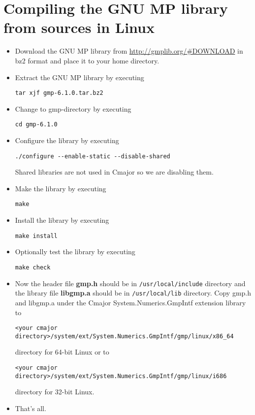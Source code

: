 \section{Compiling the GNU MP library from sources in Linux}

\begin{itemize}

\item
Download the GNU MP library from \url{http://gmplib.org/#DOWNLOAD} in bz2 format
and place it to your home directory.

\item
Extract the GNU MP library by executing
\begin{verbatim}
tar xjf gmp-6.1.0.tar.bz2
\end{verbatim}

\item
Change to gmp-directory by executing
\begin{verbatim}
cd gmp-6.1.0
\end{verbatim}

\item
Configure the library by executing
\begin{verbatim}
./configure --enable-static --disable-shared
\end{verbatim}

Shared libraries are not used in Cmajor so we are disabling them.

\item
Make the library by executing
\begin{verbatim}
make
\end{verbatim}

\item
Install the library by executing
\begin{verbatim}
make install
\end{verbatim}

\item
Optionally test the library by executing
\begin{verbatim}
make check
\end{verbatim}

\item
Now the header file \textbf{gmp.h} should be in \verb|/usr/local/include| directory
and the library file \textbf{libgmp.a} should be in \verb|/usr/local/lib| directory.
Copy gmp.h and libgmp.a under the Cmajor System.Numerics.GmpIntf extension library to 
\begin{verbatim}
<your cmajor directory>/system/ext/System.Numerics.GmpIntf/gmp/linux/x86_64
\end{verbatim}
directory for 64-bit Linux or to 
\begin{verbatim}
<your cmajor directory>/system/ext/System.Numerics.GmpIntf/gmp/linux/i686
\end{verbatim}
directory for 32-bit Linux.

\item
That's all.

\end{itemize}


